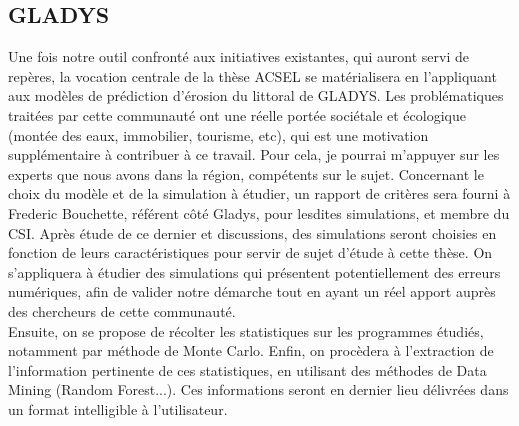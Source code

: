 \documentclass[a4paper,11pt]{article}
\begin{document}
\subsection{GLADYS}
Une fois notre outil confronté aux initiatives existantes, qui auront servi de repères, la vocation centrale de la thèse ACSEL se matérialisera en l'appliquant aux modèles de prédiction d'érosion du littoral de GLADYS. Les problématiques traitées par cette communauté ont une réelle portée sociétale et écologique (montée des eaux, immobilier, tourisme, etc), qui est une motivation supplémentaire à contribuer à ce travail.
Pour cela, je pourrai m'appuyer sur les experts que nous avons dans la région, compétents sur le sujet.
Concernant le choix du modèle et de la simulation à étudier, un rapport de critères sera fourni à Frederic Bouchette, référent côté Gladys, pour lesdites simulations, et membre du CSI. Après étude de ce dernier et discussions, des simulations seront choisies en fonction de leurs caractéristiques pour servir de sujet d'étude à cette thèse.
On s'appliquera à étudier des simulations qui présentent potentiellement des erreurs numériques, afin de valider notre démarche tout en ayant un réel apport auprès des chercheurs de cette communauté.
\\
Ensuite, on se propose de récolter les statistiques sur les programmes étudiés, notamment par méthode de Monte Carlo.
Enfin, on procèdera à l'extraction de l'information pertinente de ces statistiques, en utilisant des méthodes de Data Mining (Random Forest...).
Ces informations seront en dernier lieu délivrées dans un format intelligible à l'utilisateur.

\end{document}

